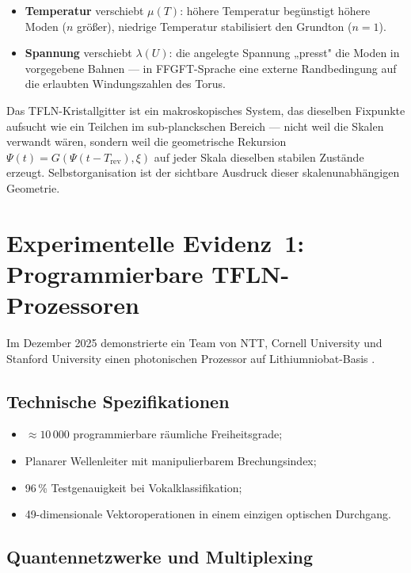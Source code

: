 \begin{itemize}
  \item \textbf{Temperatur} verschiebt $\mu(T)$: höhere Temperatur
    begünstigt höhere Moden ($n$ größer), niedrige Temperatur
    stabilisiert den Grundton ($n=1$).
  \item \textbf{Spannung} verschiebt $\lambda(U)$: die angelegte
    Spannung „presst" die Moden in vorgegebene Bahnen — in FFGFT-Sprache
    eine externe Randbedingung auf die erlaubten Windungszahlen des Torus.
\end{itemize}

\begin{keybox}
Das TFLN-Kristallgitter ist ein makroskopisches System, das dieselben
Fixpunkte aufsucht wie ein Teilchen im sub-planckschen Bereich — nicht
weil die Skalen verwandt wären, sondern weil die geometrische Rekursion
$\Psi(t) = G(\Psi(t-T_{\text{rev}}), \xi)$ auf jeder Skala dieselben
stabilen Zustände erzeugt. Selbstorganisation ist der sichtbare Ausdruck
dieser skalenunabhängigen Geometrie.
\end{keybox}

\section{Experimentelle Evidenz~1: Programmierbare TFLN-Prozessoren}

Im Dezember 2025 demonstrierte ein Team von NTT, Cornell University und
Stanford University einen photonischen Prozessor auf Lithiumniobat-Basis
\cite{NTT2025}.

\subsection{Technische Spezifikationen}

\begin{itemize}
  \item $\approx 10\,000$ programmierbare räumliche Freiheitsgrade;
  \item Planarer Wellenleiter mit manipulierbarem Brechungsindex;
  \item 96\,\% Testgenauigkeit bei Vokalklassifikation;
  \item 49-dimensionale Vektoroperationen in einem einzigen optischen Durchgang.
\end{itemize}

\subsection{Quantennetzwerke und Multiplexing}


